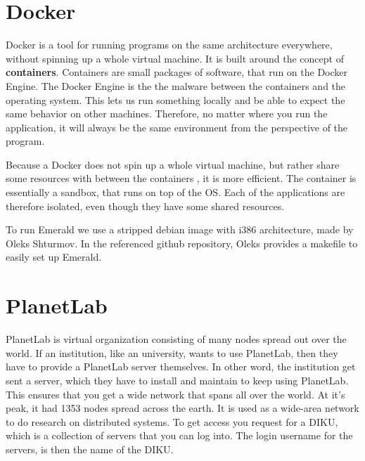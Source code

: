 \section{Docker}
Docker is a tool for running programs on the same architecture everywhere, without spinning up a whole virtual machine. It is built around the concept of \textbf{containers}. Containers are small packages of software, that run on the Docker Engine. The Docker Engine is the the malware between the containers and the operating system. This lets us run something locally and be able to expect the same behavior on other machines. Therefore, no matter where you run the application, it will always be the same environment from the perspective of the program. 

Because a Docker does not spin up a whole virtual machine, but rather share some resources with between the containers \cite{dockercom_what_nodate}, it is more efficient. The container is essentially a sandbox, that runs on top of the OS. Each of the applications are therefore isolated, even though they have some shared resources.

To run Emerald we use a stripped debian image with i386 architecture, made by Oleks Shturmov\cite{oleks_oleksdocker-in5570v21_2021}.
In the referenced github repository, Oleks provides a makefile to easily set up Emerald.



\section{PlanetLab}
PlanetLab is virtual organization consisting of many nodes spread out over the world. If an institution, like an university, wants to use PlanetLab, then they have to provide a PlanetLab server themselves. In other word, the institution get sent a server, which they have to install and maintain to keep using PlanetLab. This ensures that you get a wide network that spans all over the world. At it's peak, it had 1353 nodes spread across the earth\cite{noauthor_planetlab_nodate}. It is used as a wide-area network to do research on distributed systems. To get access you request for a DIKU, which is a collection of servers that you can log into. The login username for the servers, is then the name of the DIKU.

